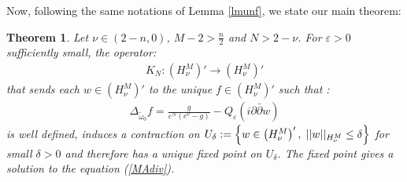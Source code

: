 \documentclass[a4paper,11pt]{article}
\newcounter{mythm}[section]
\newtheorem{tm}[mythm]{Theorem}
\begin{document}
Now, following the same notations of Lemma \ref{lmunf}, we state our main theorem:
\begin{tm}
Let $\nu \in (2-n,0)$, $M-2 > \frac{n}{2}$ and $N > 2 - \nu$. For $\varepsilon>0$ sufficiently small, the operator: 
\begin{align*}
K_N : \left(H_{\nu}^M\right)' \rightarrow  \left(H_{\nu}^M \right)'
\end{align*}
that sends each $w \in \left(H_{ \nu}^M \right)'$ to the unique $f \in \left(H_{ \nu}^M \right)'$  such that : \begin{align}
 \Delta_{\tilde \omega_0} f =  \frac{g}{\varepsilon^N (e^{v} - g)} - Q_{\varepsilon}(i \partial \bar{\partial} w)\end{align}
is well defined, induces a contraction on $U_{\delta} := \left\{ w \in \left(H_{\nu}^M \right)', \hspace{0.1cm} ||w||_{H_{\nu}^M} \leq \delta \right\}$ for small $\delta >0$ and therefore has a unique fixed point on $U_{\delta}$. The fixed point gives a solution to the equation (\ref{MAdiv}).
\end{tm}
\end{document}
